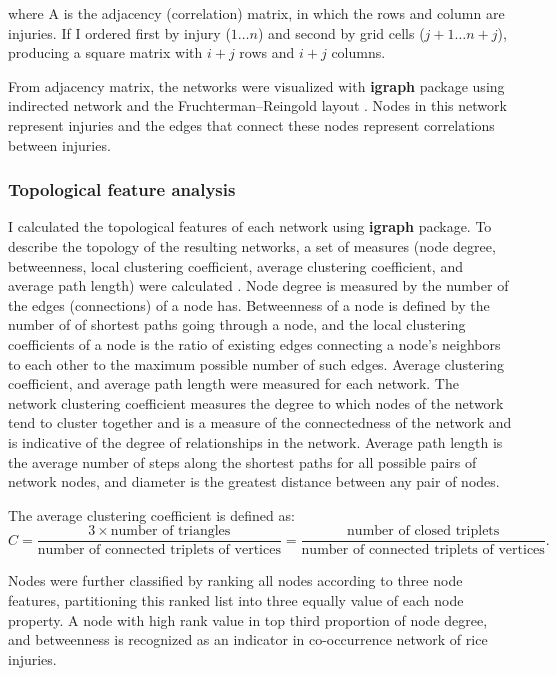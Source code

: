 where A is the adjacency (correlation) matrix, in which the rows and column are injuries. If I ordered first by injury ($1\dots n$) and second by grid cells ($j + 1\dots n + j$), producing a square matrix with $i + j$ rows and $i + j$ columns.

From adjacency matrix, the networks were visualized with \textbf{igraph} package \citep{Csardi_2010_igraph} using indirected network and the Fruchterman–Reingold layout \citep{Fruchterman_1991_Graph}. Nodes in this network represent injuries and the edges that connect these nodes represent correlations between injuries. 

\subsubsection{Topological feature analysis}

I calculated the topological features of each network using \textbf{igraph} package. To describe the topology of the resulting networks, a set of measures (node degree, betweenness, local clustering coefficient, average clustering coefficient, and average path length) were calculated \citep{Newman_2006_Modularity}. Node degree is measured by the number of the edges (connections) of a node has. Betweenness of a node is defined by the number of of shortest paths going through a node, and the local clustering coefficients of a node is the ratio of existing edges connecting a node's neighbors to each other to the maximum possible number of such edges. Average clustering coefficient, and average path length were measured for each network. The network clustering coefficient measures the degree to which nodes of the network tend to cluster together and is a measure of the connectedness of the network and is indicative of the degree of relationships in the network. Average path length is the average number of steps along the shortest paths for all possible pairs of network nodes, and diameter is the greatest distance between any pair of nodes. 

The average clustering coefficient is defined as:
\begin{equation}
C = \frac{3 \times \mbox{number of triangles}}{\mbox{number of connected triplets of vertices}} = \frac{\mbox{number of closed triplets}}{\mbox{number of connected triplets of vertices}}.
\end{equation}


Nodes were further classified by ranking all nodes according to three node features, partitioning this ranked list into three equally value of each node property. A node with high rank value in top third proportion of node degree, and betweenness is recognized as an indicator in co-occurrence network of rice injuries. 


